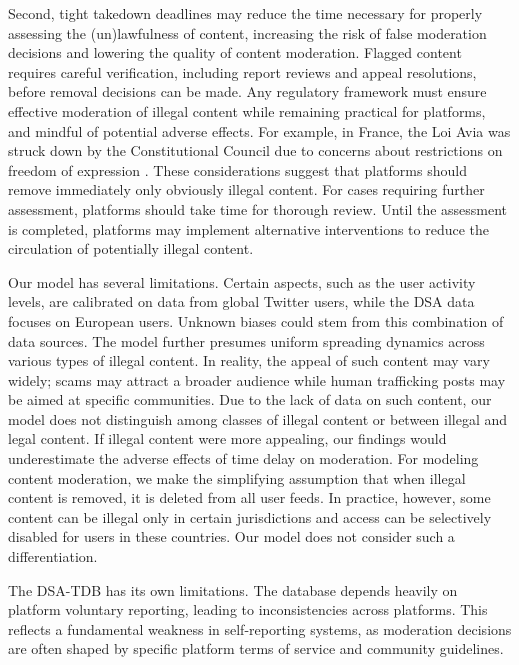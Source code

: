 \documentclass{article}
\begin{document}
Second, tight takedown deadlines may reduce the time necessary for properly assessing the (un)lawfulness of content, increasing the risk of false moderation decisions and lowering the quality of content moderation. Flagged content requires careful verification, including report reviews and appeal resolutions, before removal decisions can be made. Any regulatory framework must ensure effective moderation of illegal content while remaining practical for platforms, and mindful of potential adverse effects. For example, in France, the Loi Avia was struck down by the Constitutional Council \cite{conseil_constitutionnel_2020} due to concerns about restrictions on freedom of expression \cite{heldt_2020, vie_publique_2020}. 
These considerations suggest that platforms should remove immediately only obviously illegal content. For cases requiring further assessment, platforms should take time for thorough review. Until the assessment is completed, platforms may implement alternative interventions to reduce the circulation of potentially illegal content.  

Our model has several limitations. Certain aspects, such as the user activity levels, are calibrated on data from global Twitter users, while the DSA data focuses on European users. Unknown biases could stem from this combination of data sources. 
%
The model further presumes uniform spreading dynamics across various types of illegal content. In reality, the appeal of such content may vary widely; scams may attract a broader audience while human trafficking posts may be aimed at specific communities.
Due to the lack of data on such content, our model does not distinguish among classes of illegal content or between illegal and legal content. If illegal content were more appealing, our findings would underestimate the adverse effects of time delay on moderation. 
%
For modeling content moderation, we make the simplifying assumption that when illegal content is removed, it is deleted from all user feeds. In practice, however, some content can be illegal only in certain jurisdictions and access can be selectively disabled for users in these countries. Our model does not consider such a differentiation.

The DSA-TDB has its own limitations. The database depends heavily on platform voluntary reporting, leading to inconsistencies across platforms. This reflects a fundamental weakness in self-reporting systems, as moderation decisions are often shaped by specific platform terms of service and community guidelines.
\end{document}
